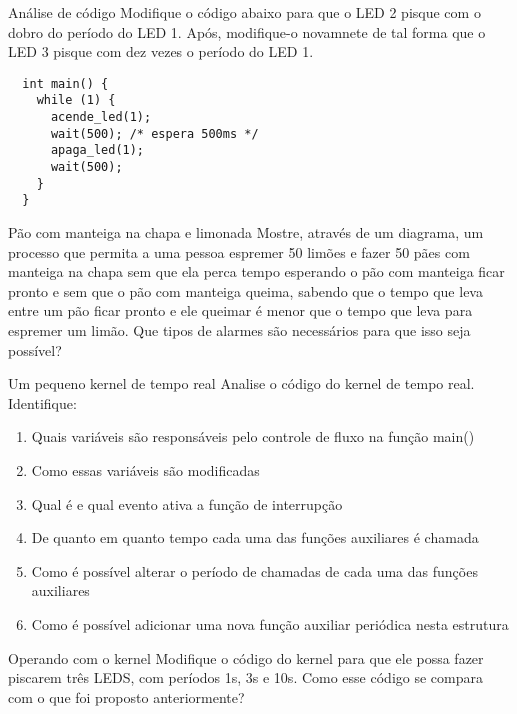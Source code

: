 \documentclass{beamer}
\begin{document}
\begin{frame}[fragile]{Análise de código}
  \centering
  \large
  Modifique o código abaixo para que o LED 2 pisque com o dobro do período do
  LED 1. Após, modifique-o novamnete de tal forma que o LED 3 pisque com dez
  vezes o período do LED 1.
  \begin{verbatim}
  int main() {
    while (1) {
      acende_led(1);
      wait(500); /* espera 500ms */
      apaga_led(1);
      wait(500);
    }
  }
  \end{verbatim}
\end{frame}

\begin{frame}[fragile]{Pão com manteiga na chapa e limonada}
  \centering
  \large
  Mostre, através de um diagrama, um processo que permita a uma pessoa espremer
  50 limões e fazer 50 pães com manteiga na chapa sem que ela perca tempo
  esperando o pão com manteiga ficar pronto e sem que o pão com manteiga queima,
  sabendo que o tempo que leva entre um pão ficar pronto e ele queimar é menor
  que o tempo que leva para espremer um limão. Que tipos de alarmes são
  necessários para que isso seja possível?
\end{frame}

\begin{frame}[fragile]{Um pequeno kernel de tempo real}
  \centering
  \large
  Analise o código do kernel de tempo real. Identifique:
  \begin{enumerate}
    \item Quais variáveis são responsáveis pelo controle de fluxo na função main()
    \item Como essas variáveis são modificadas
    \item Qual é e qual evento ativa a função de interrupção
    \item De quanto em quanto tempo cada uma das funções auxiliares é chamada
    \item Como é possível alterar o período de chamadas de cada uma das funções
      auxiliares
    \item Como é possível adicionar uma nova função auxiliar periódica nesta
      estrutura
  \end{enumerate}
\end{frame}

\begin{frame}[fragile]{Operando com o kernel}
  \centering
  \large
  Modifique o código do kernel para que ele possa fazer piscarem três LEDS, com
  períodos 1s, 3s e 10s. Como esse código se compara com o que foi proposto
  anteriormente?
\end{frame}
\end{document}

